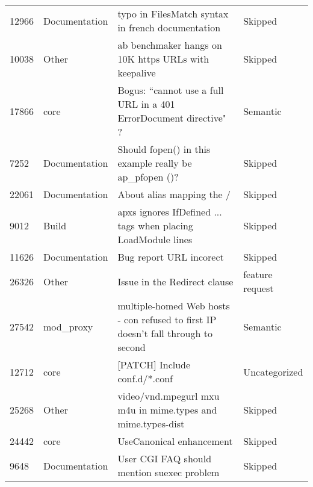 \begin{longtable}[c]{llll}
12966  & Documentation      & typo in FilesMatch syntax in french documentation                                                              & Skipped           \\
10038  & Other              & ab benchmaker hangs on 10K https URLs with keepalive                                                           & Skipped           \\
17866  & core               & Bogus: ``cannot use a full URL in a 401 ErrorDocument directive" ?                                              & Semantic          \\
7252   & Documentation      & Should fopen() in this example really be ap\_pfopen ()?                                                        & Skipped           \\
22061  & Documentation      & About alias mapping the /                                                                                      & Skipped           \\
9012   & Build              & apxs ignores IfDefined ... tags when placing LoadModule lines                             & Skipped           \\
11626  & Documentation      & Bug report URL incorect                                                                                        & Skipped           \\
26326  & Other              & Issue in the Redirect clause                                                                                   & feature request   \\
27542  & mod\_proxy         & multiple-homed Web hosts - con refused to first IP doesn't fall through to second                              & Semantic          \\
12712  & core               & {[}PATCH{]} Include conf.d/*.conf                                                                              & Uncategorized     \\
25268  & Other              & video/vnd.mpegurl mxu m4u in mime.types and mime.types-dist                                                    & Skipped           \\
24442  & core               & UseCanonical enhancement                                                                                       & Skipped           \\
9648   & Documentation      & User CGI FAQ should mention suexec problem                                                                     & Skipped           \\

\end{longtable}
